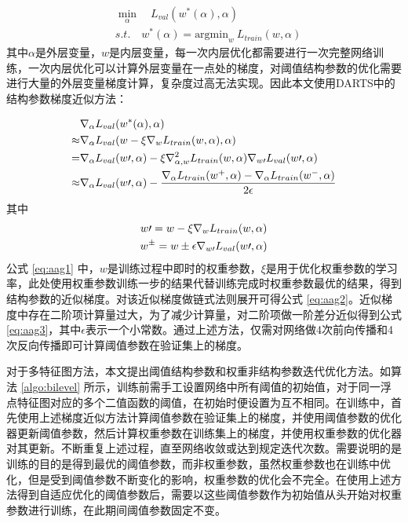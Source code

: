 \begin{equation}
  \label{eq:bilevel}
  \begin{split}
  & \min_{\alpha} \quad L_{val}(w^*(\alpha), \alpha) \\
  & s.t. \quad w^*(\alpha) = \text{argmin}_w \ L_{train}(w, \alpha)
  \end{split}
\end{equation}
其中$\alpha$是外层变量，$w$是内层变量，每一次内层优化都需要进行一次完整网络训练，一次内层优化可以计算外层变量在一点处的梯度，对阈值结构参数的优化需要进行大量的外层变量梯度计算，复杂度过高无法实现。因此本文使用DARTS\cite{darts}中的结构参数梯度近似方法：

\begin{align}
  & \nabla_{\alpha} L_{val}(w^*(\alpha),\alpha) \notag \\
  \approx & \nabla_{\alpha} L_{val}(w - \xi \nabla_w L_{train}(w, \alpha),\alpha) \label{eq:aag1} \\
  = & \nabla_{\alpha} L_{val}(w\prime, \alpha) - \xi \nabla^2_{\alpha, w} L_{train}(w, \alpha) \nabla_{w\prime} L_{val}(w\prime, \alpha) \label{eq:aag2} \\
  \approx & \nabla_{\alpha} L_{val}(w\prime, \alpha) - \frac{\nabla_{\alpha}L_{train}(w^+, \alpha) - \nabla_{\alpha}L_{train}(w^-, \alpha)}{2\epsilon} \label{eq:aag3}
\end{align}
其中
\begin{gather}
  w\prime = w - \xi \nabla_w L_{train}(w, \alpha) \notag \\
  w^{\pm} = w \pm \epsilon \nabla_{w\prime} L_{val}(w\prime, \alpha) \notag
\end{gather}
公式 \eqref{eq:aag1} 中，$w$是训练过程中即时的权重参数，$\xi$是用于优化权重参数的学习率，此处使用权重参数训练一步的结果代替训练完成时权重参数最优的结果，得到结构参数的近似梯度。对该近似梯度做链式法则展开可得公式 \eqref{eq:aag2}。近似梯度中存在二阶项计算量过大，为了减少计算量，对二阶项做一阶差分近似得到公式 \eqref{eq:aag3}，其中$\epsilon$表示一个小常数。通过上述方法，仅需对网络做4次前向传播和4次反向传播即可计算阈值参数在验证集上的梯度。

对于多特征图方法，本文提出阈值结构参数和权重非结构参数迭代优化方法。如算法 \ref{algo:bilevel} 所示，训练前需手工设置网络中所有阈值的初始值，对于同一浮点特征图对应的多个二值函数的阈值，在初始时便设置为互不相同。在训练中，首先使用上述梯度近似方法计算阈值参数在验证集上的梯度，并使用阈值参数的优化器更新阈值参数，然后计算权重参数在训练集上的梯度，并使用权重参数的优化器对其更新。不断重复上述过程，直至网络收敛或达到规定迭代次数。需要说明的是训练的目的是得到最优的阈值参数，而非权重参数，虽然权重参数也在训练中优化，但是受到阈值参数不断变化的影响，权重参数的优化会不完全。在使用上述方法得到自适应优化的阈值参数后，需要以这些阈值参数作为初始值从头开始对权重参数进行训练，在此期间阈值参数固定不变。

